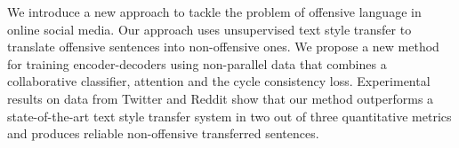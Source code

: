 We introduce a new approach to tackle the problem of offensive language in online social media. Our approach uses unsupervised text style transfer to translate offensive sentences into non-offensive ones. We propose a new method for training encoder-decoders using non-parallel data that combines a collaborative classifier, attention and the cycle consistency loss. Experimental results on data from Twitter and Reddit show that our method outperforms a state-of-the-art text style transfer system in two out of three quantitative metrics and produces reliable non-offensive transferred sentences.
